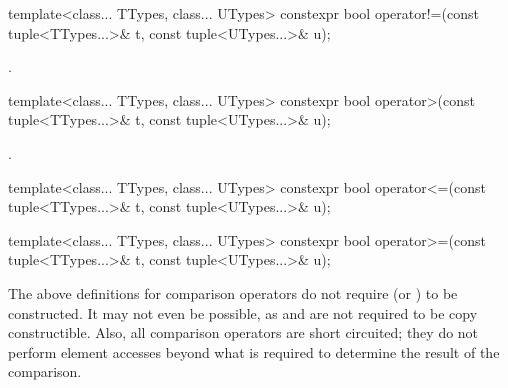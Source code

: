 %
%
\begin{itemdecl}
template<class... TTypes, class... UTypes>
  constexpr bool operator!=(const tuple<TTypes...>& t, const tuple<UTypes...>& u);
\end{itemdecl}
\begin{itemdescr}
\pnum\returns {}.
\end{itemdescr}

%
%
\begin{itemdecl}
template<class... TTypes, class... UTypes>
  constexpr bool operator>(const tuple<TTypes...>& t, const tuple<UTypes...>& u);
\end{itemdecl}
\begin{itemdescr}
\pnum\returns {}.
\end{itemdescr}

%
%
\begin{itemdecl}
template<class... TTypes, class... UTypes>
  constexpr bool operator<=(const tuple<TTypes...>& t, const tuple<UTypes...>& u);
\end{itemdecl}
\begin{itemdescr}
\pnum\returns {}
\end{itemdescr}

%
%
\begin{itemdecl}
template<class... TTypes, class... UTypes>
  constexpr bool operator>=(const tuple<TTypes...>& t, const tuple<UTypes...>& u);
\end{itemdecl}

\begin{itemdescr}
\pnum\returns {}
\end{itemdescr}

\pnum \enternote The above definitions for comparison operators
do not require 
(or ) to be constructed. It may not
even be possible, as  and  are not required to be copy
constructible. Also, all comparison operators are short circuited;
they do not perform element accesses beyond what is required to determine the
result of the comparison. \exitnote

